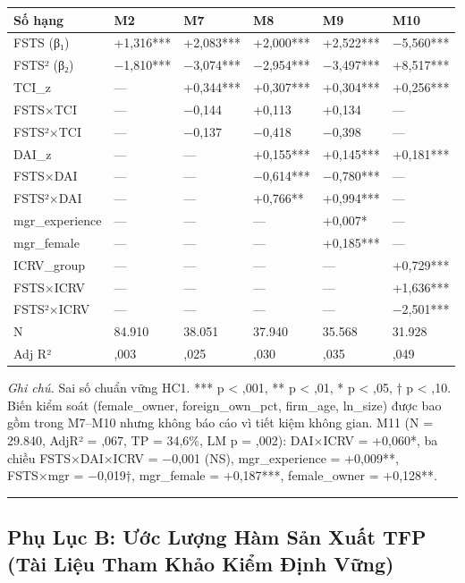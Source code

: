 \documentclass[12pt,a4paper]{article}
\begin{document}
\begin{longtable}[]{@{}llllll@{}}
\toprule\noalign{}
Số hạng & M2 & M7 & M8 & M9 & M10 \\
\midrule\noalign{}
\endhead
\bottomrule\noalign{}
\endlastfoot
FSTS (β₁) & +1,316*** & +2,083*** & +2,000*** & +2,522*** & −5,560*** \\
FSTS² (β₂) & −1,810*** & −3,074*** & −2,954*** & −3,497*** &
+8,517*** \\
TCI\_z & --- & +0,344*** & +0,307*** & +0,304*** & +0,256*** \\
FSTS×TCI & --- & −0,144 & +0,113 & +0,134 & --- \\
FSTS²×TCI & --- & −0,137 & −0,418 & −0,398 & --- \\
DAI\_z & --- & --- & +0,155*** & +0,145*** & +0,181*** \\
FSTS×DAI & --- & --- & −0,614*** & −0,780*** & --- \\
FSTS²×DAI & --- & --- & +0,766** & +0,994*** & --- \\
mgr\_experience & --- & --- & --- & +0,007* & --- \\
mgr\_female & --- & --- & --- & +0,185*** & --- \\
ICRV\_group & --- & --- & --- & --- & +0,729*** \\
FSTS×ICRV & --- & --- & --- & --- & +1,636*** \\
FSTS²×ICRV & --- & --- & --- & --- & −2,501*** \\
N & 84.910 & 38.051 & 37.940 & 35.568 & 31.928 \\
Adj R² & ,003 & ,025 & ,030 & ,035 & ,049 \\
\end{longtable}

\emph{Ghi chú.} Sai số chuẩn vững HC1. *** p \textless{} ,001, ** p
\textless{} ,01, * p \textless{} ,05, † p \textless{} ,10. Biến kiểm
soát (female\_owner, foreign\_own\_pct, firm\_age, ln\_size) được bao
gồm trong M7--M10 nhưng không báo cáo vì tiết kiệm không gian. M11 (N =
29.840, AdjR² = ,067, TP = 34,6\%, LM p = ,002): DAI×ICRV = +0,060*, ba
chiều FSTS×DAI×ICRV = −0,001 (NS), mgr\_experience = +0,009**, FSTS×mgr
= −0,019†, mgr\_female = +0,187***, female\_owner = +0,128**.

\begin{center}\rule{0.5\linewidth}{0.5pt}\end{center}

\hypertarget{phux1ee5-lux1ee5c-b-ux1b0ux1edbc-lux1b0ux1ee3ng-huxe0m-sux1ea3n-xuux1ea5t-tfp-tuxe0i-liux1ec7u-tham-khux1ea3o-kiux1ec3m-ux111ux1ecbnh-vux1eefng}{%
\subsection{Phụ Lục B: Ước Lượng Hàm Sản Xuất TFP (Tài Liệu Tham Khảo
Kiểm Định
Vững)}\label{phux1ee5-lux1ee5c-b-ux1b0ux1edbc-lux1b0ux1ee3ng-huxe0m-sux1ea3n-xuux1ea5t-tfp-tuxe0i-liux1ec7u-tham-khux1ea3o-kiux1ec3m-ux111ux1ecbnh-vux1eefng}}
\end{document}
